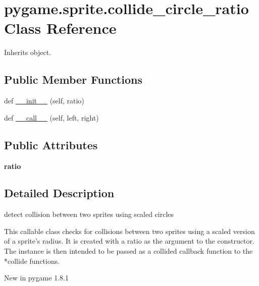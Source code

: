 \hypertarget{classpygame_1_1sprite_1_1collide__circle__ratio}{}\section{pygame.\+sprite.\+collide\+\_\+circle\+\_\+ratio Class Reference}
\label{classpygame_1_1sprite_1_1collide__circle__ratio}


Inherits object.

\subsection*{Public Member Functions}
\begin{DoxyCompactItemize}
\item 
def \hyperlink{classpygame_1_1sprite_1_1collide__circle__ratio_a9e8814fc9fa6f041f00a6364bfd8a1b3}{\+\_\+\+\_\+init\+\_\+\+\_\+} (self, ratio)
\item 
def \hyperlink{classpygame_1_1sprite_1_1collide__circle__ratio_a31932a1fe8275e90f63ccf5c195416f3}{\+\_\+\+\_\+call\+\_\+\+\_\+} (self, left, right)
\end{DoxyCompactItemize}
\subsection*{Public Attributes}
\begin{DoxyCompactItemize}
\item 
\mbox{\label{classpygame_1_1sprite_1_1collide__circle__ratio_a47a55dd2985218dfad71e2e13d0ca734}} 
{\bfseries ratio}
\end{DoxyCompactItemize}


\subsection{Detailed Description}
\begin{DoxyVerb}detect collision between two sprites using scaled circles

This callable class checks for collisions between two sprites using a
scaled version of a sprite's radius. It is created with a ratio as the
argument to the constructor. The instance is then intended to be passed as
a collided callback function to the *collide functions.

New in pygame 1.8.1\end{DoxyVerb}
 

